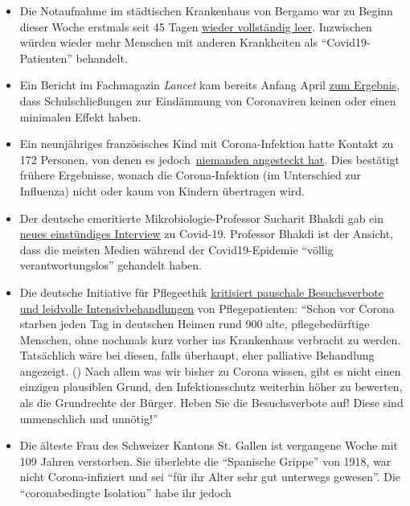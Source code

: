 \begin{itemize}
\item
  Die Notaufnahme im städtischen Krankenhaus von Bergamo war zu Beginn
  dieser Woche erstmals seit 45 Tagen
  \href{https://orf.at/stories/3162642/}{wieder vollständig leer}.
  Inzwischen würden wieder mehr Menschen mit anderen Krankheiten als
  ``Covid19-Patienten'' behandelt.
\item
  Ein Bericht im Fachmagazin \emph{Lancet} kam bereits Anfang April
  \href{https://www.thelancet.com/journals/lanchi/article/PIIS2352-4642(20)30095-X/fulltext}{zum
  Ergebnis}, dass Schulschließungen zur Eindämmung von Coronaviren
  keinen oder einen minimalen Effekt haben.
\item
  Ein neunjähriges französisches Kind mit Corona-Infektion hatte Kontakt
  zu 172 Personen, von denen es
  jedoch~\href{https://www.n-tv.de/panorama/172-Kontaktpersonen-von-Corona-verschont-article21727469.html}{niemanden
  angesteckt hat}. Dies bestätigt frühere Ergebnisse, wonach die
  Corona-Infektion (im Unterschied zur Influenza) nicht oder kaum von
  Kindern übertragen wird.
\item
  Der deutsche emeritierte Mikrobiologie-Professor Sucharit Bhakdi gab
  ein
  \href{https://kenfm.de/kenfm-am-set-gespraech-mit-prof-dr-sucharit-bhakdi-zu-covid-19/}{neues
  einstündiges Interview} zu Covid-19. Professor Bhakdi ist der Ansicht,
  dass die meisten Medien während der Covid19-Epidemie ``völlig
  verantwortungslos'' gehandelt haben.
\item
  Die deutsche Initiative für Pflegeethik
  \href{http://pflegeethik-initiative.de/2020/04/15/corona-krise-falsche-prioritaeten-gesetzt-und-ethische-prinzipien-verletzt/}{kritisiert
  pauschale Besuchsverbote und leidvolle Intensivbehandlungen} von
  Pflegepatienten: ``Schon vor Corona starben jeden Tag in deutschen
  Heimen rund 900 alte, pflegebedürftige Menschen, ohne nochmals kurz
  vorher ins Krankenhaus verbracht zu werden. Tatsächlich wäre bei
  diesen, falls überhaupt, eher palliative Behandlung angezeigt. () Nach
  allem was wir bisher zu Corona wissen, gibt es nicht einen einzigen
  plausiblen Grund, den Infektionsschutz weiterhin höher zu bewerten,
  als die Grundrechte der Bürger. Heben Sie die Besuchsverbote auf!
  Diese sind unmenschlich und unnötig!''
\item
  Die älteste Frau des Schweizer Kantons St. Gallen ist vergangene Woche
  mit 109 Jahren verstorben. Sie überlebte die ``Spanische Grippe'' von
  1918, war nicht Corona-infiziert und sei ``für ihr Alter sehr gut
  unterwegs gewesen''. Die ``coronabedingte Isolation'' habe ihr jedoch

\end{itemize}
